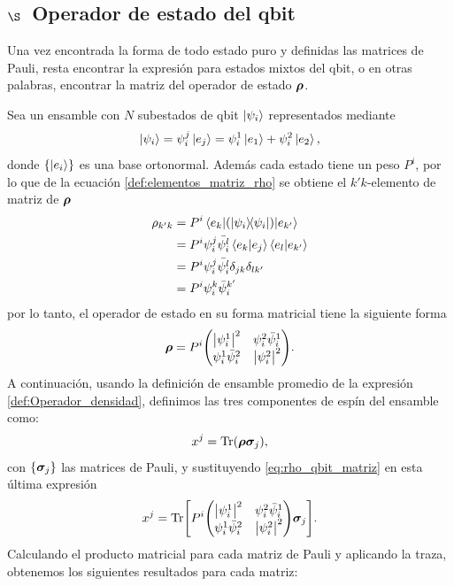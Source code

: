 \documentclass[../Main.tex]{subfiles}
\begin{document}
\subsection*{$\S$~Operador de estado del qbit}

Una vez encontrada la forma de todo estado puro y definidas las matrices de Pauli, resta encontrar la expresión para estados mixtos del qbit, o en otras palabras, encontrar la matriz del operador de estado $\bm{\rho}$.

Sea un ensamble con $N$ subestados de qbit $\ket{\psi_i}$ representados mediante
\begin{equation}
    \ket{\psi_i}=\psi^j_i\ket{e_j}=\psi^1_i\ket{e_1}+\psi^2_i\ket{e_2},
    \label{def:operador_hilbert_qbit}
\end{equation}
donde $\qty{\ket{e_i}}$ es una base ortonormal. Además cada estado tiene un peso $P^i$, por lo que de la ecuación \eqref{def:elementos_matriz_rho} se obtiene el $k'k$-elemento de matriz de $\bm{\rho}$ 
\begin{align}
    \rho_{k'k}
    &=P^i\mel{e_k}{\qty(\op{\psi_i})}{e_{k'}}\notag\\
    &=P^i\psi^j_i\bar{\psi^l_i}\ip{e_k}{e_j}\ip{e_l}{e_{k'}}\notag\\
    &=P^i\psi^j_i\bar{\psi^l_i}\delta_{jk}\delta_{lk'}\notag\\
    &=P^i\psi^k_i\bar{\psi}^{k'}_i
\end{align}
por lo tanto, el operador de estado en su forma matricial tiene la siguiente forma
\begin{equation}
    \rhon = P^i \mqty(\abs{\psi_i^1}^2&\psi_i^2\bar{\psi}_i^1\\\psi_i^1\bar{\psi}_i^2&\abs{\psi_i^2}^2).
    \label{eq:rho_qbit_matriz}
\end{equation}
A continuación, usando la definición de ensamble promedio de la expresión \eqref{def:Operador_densidad}, definimos las tres componentes de espín del ensamble como:
\begin{equation}
    x^j=\Tr(\bm{\rho}\bm{\sigma}_j),
\end{equation}
con $\qty{\bm{\sigma}_j}$ las matrices de Pauli, y sustituyendo \eqref{eq:rho_qbit_matriz} en esta última expresión
\begin{equation}
    x^j=\Tr[P^i \mqty(\abs{\psi_i^1}^2&\psi_i^2\bar{\psi}_i^1\\\psi_i^1\bar{\psi}_i^2&\abs{\psi_i^2}^2)\bm{\sigma}_j].
\end{equation}
Calculando el producto matricial para cada matriz de Pauli y aplicando la traza, obtenemos los siguientes resultados para cada matriz:
\end{document}
